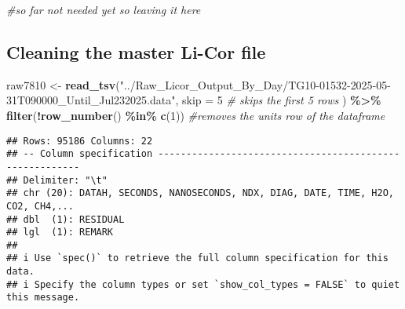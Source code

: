 \documentclass[
]{article}
\newenvironment{Shaded}{\begin{snugshade}}{\end{snugshade}}
\newcommand{\AttributeTok}[1]{\textcolor[rgb]{0.13,0.29,0.53}{#1}}
\newcommand{\CommentTok}[1]{\textcolor[rgb]{0.56,0.35,0.01}{\textit{#1}}}
\newcommand{\DecValTok}[1]{\textcolor[rgb]{0.00,0.00,0.81}{#1}}
\newcommand{\FunctionTok}[1]{\textcolor[rgb]{0.13,0.29,0.53}{\textbf{#1}}}
\newcommand{\NormalTok}[1]{#1}
\newcommand{\OtherTok}[1]{\textcolor[rgb]{0.56,0.35,0.01}{#1}}
\newcommand{\SpecialCharTok}[1]{\textcolor[rgb]{0.81,0.36,0.00}{\textbf{#1}}}
\newcommand{\StringTok}[1]{\textcolor[rgb]{0.31,0.60,0.02}{#1}}
\begin{document}
\begin{Shaded}
\begin{Highlighting}[]
\CommentTok{\#so far not needed yet so leaving it here}
\end{Highlighting}
\end{Shaded}

\subsection{Cleaning the master Li-Cor
file}\label{cleaning-the-master-li-cor-file}

\begin{Shaded}
\begin{Highlighting}[]
\NormalTok{raw7810 }\OtherTok{\textless{}{-}} \FunctionTok{read\_tsv}\NormalTok{(}\StringTok{"../Raw\_Licor\_Output\_By\_Day/TG10{-}01532{-}2025{-}05{-}31T090000\_Until\_Jul232025.data"}\NormalTok{,}
                    \AttributeTok{skip =} \DecValTok{5}   \CommentTok{\# skips the first 5 rows      }
\NormalTok{                    ) }\SpecialCharTok{\%\textgreater{}\%}
  \FunctionTok{filter}\NormalTok{(}\SpecialCharTok{!}\FunctionTok{row\_number}\NormalTok{() }\SpecialCharTok{\%in\%} \FunctionTok{c}\NormalTok{(}\DecValTok{1}\NormalTok{))  }\CommentTok{\#removes the units row of the dataframe}
\end{Highlighting}
\end{Shaded}

\begin{verbatim}
## Rows: 95186 Columns: 22
## -- Column specification --------------------------------------------------------
## Delimiter: "\t"
## chr (20): DATAH, SECONDS, NANOSECONDS, NDX, DIAG, DATE, TIME, H2O, CO2, CH4,...
## dbl  (1): RESIDUAL
## lgl  (1): REMARK
## 
## i Use `spec()` to retrieve the full column specification for this data.
## i Specify the column types or set `show_col_types = FALSE` to quiet this message.
\end{verbatim}
\end{document}
